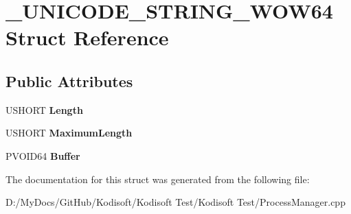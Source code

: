 \hypertarget{struct___u_n_i_c_o_d_e___s_t_r_i_n_g___w_o_w64}{\section{\+\_\+\+U\+N\+I\+C\+O\+D\+E\+\_\+\+S\+T\+R\+I\+N\+G\+\_\+\+W\+O\+W64 Struct Reference}
\label{struct___u_n_i_c_o_d_e___s_t_r_i_n_g___w_o_w64}
}
\subsection*{Public Attributes}
\begin{DoxyCompactItemize}
\item 
\hypertarget{struct___u_n_i_c_o_d_e___s_t_r_i_n_g___w_o_w64_a2e067b5bf10223dee38df4b9101b07f9}{U\+S\+H\+O\+R\+T {\bfseries Length}}\label{struct___u_n_i_c_o_d_e___s_t_r_i_n_g___w_o_w64_a2e067b5bf10223dee38df4b9101b07f9}

\item 
\hypertarget{struct___u_n_i_c_o_d_e___s_t_r_i_n_g___w_o_w64_a1849eeba3648f70e29b239fa9fe2ecfb}{U\+S\+H\+O\+R\+T {\bfseries Maximum\+Length}}\label{struct___u_n_i_c_o_d_e___s_t_r_i_n_g___w_o_w64_a1849eeba3648f70e29b239fa9fe2ecfb}

\item 
\hypertarget{struct___u_n_i_c_o_d_e___s_t_r_i_n_g___w_o_w64_a0ba9d9a1e2e45f02879da6b545fa0798}{P\+V\+O\+I\+D64 {\bfseries Buffer}}\label{struct___u_n_i_c_o_d_e___s_t_r_i_n_g___w_o_w64_a0ba9d9a1e2e45f02879da6b545fa0798}

\end{DoxyCompactItemize}


The documentation for this struct was generated from the following file\+:\begin{DoxyCompactItemize}
\item 
D\+:/\+My\+Docs/\+Git\+Hub/\+Kodisoft/\+Kodisoft Test/\+Kodisoft Test/Process\+Manager.\+cpp\end{DoxyCompactItemize}
